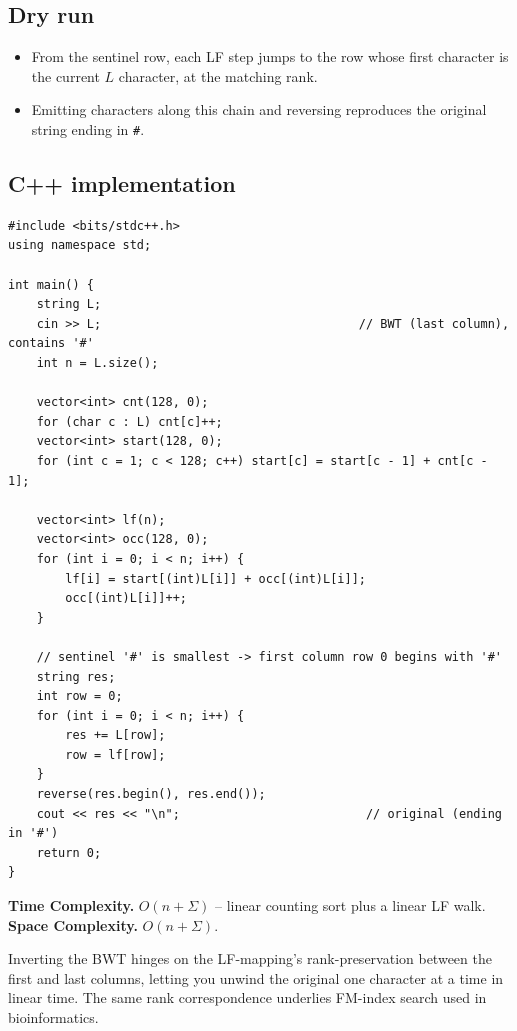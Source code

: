 \subsection*{Dry run}


\begin{itemize}
  \item From the sentinel row, each LF step jumps to the row whose first
        character is the current $L$ character, at the matching rank.
  \item Emitting characters along this chain and reversing reproduces the
        original string ending in \texttt{\#}.
\end{itemize}

\subsection*{C++ implementation}

\begin{lstlisting}
#include <bits/stdc++.h>
using namespace std;

int main() {
    string L;
    cin >> L;                                    // BWT (last column), contains '#'
    int n = L.size();

    vector<int> cnt(128, 0);
    for (char c : L) cnt[c]++;
    vector<int> start(128, 0);
    for (int c = 1; c < 128; c++) start[c] = start[c - 1] + cnt[c - 1];

    vector<int> lf(n);
    vector<int> occ(128, 0);
    for (int i = 0; i < n; i++) {
        lf[i] = start[(int)L[i]] + occ[(int)L[i]];
        occ[(int)L[i]]++;
    }

    // sentinel '#' is smallest -> first column row 0 begins with '#'
    string res;
    int row = 0;
    for (int i = 0; i < n; i++) {
        res += L[row];
        row = lf[row];
    }
    reverse(res.begin(), res.end());
    cout << res << "\n";                          // original (ending in '#')
    return 0;
}
\end{lstlisting}

\begin{complexitybox}
\textbf{Time Complexity.} $O(n+\Sigma)$ -- linear counting sort plus a
linear LF walk. \textbf{Space Complexity.} $O(n+\Sigma)$.
\end{complexitybox}

\begin{takeawaybox}
Inverting the BWT hinges on the LF-mapping's rank-preservation between the
first and last columns, letting you unwind the original one character at a
time in linear time. The same rank correspondence underlies FM-index
search used in bioinformatics.
\end{takeawaybox}
